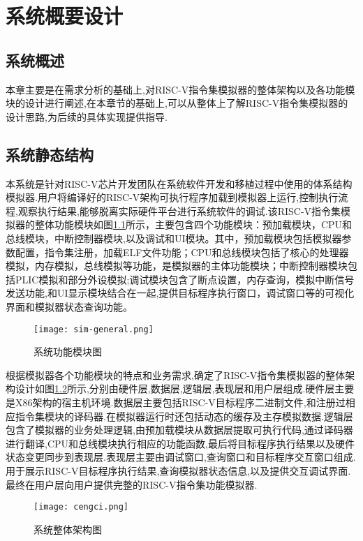 
\chapter{系统概要设计}

\section{系统概述}
本章主要是在需求分析的基础上,对RISC-V指令集模拟器的整体架构以及各功能模块的设计进行阐述,在本章节的基础上,可以从整体上了解RISC-V指令集模拟器的设计思路,为后续的具体实现提供指导.


\section{系统静态结构}
本系统是针对RISC-V芯片开发团队在系统软件开发和移植过程中使用的体系结构模拟器.用户将编译好的RISC-V架构可执行程序加载到模拟器上运行,控制执行流程,观察执行结果,能够脱离实际硬件平台进行系统软件的调试.该RISC-V指令集模拟器的整体功能模块如图\ref{fig:sim_general}所示，主要包含四个功能模块：预加载模块，CPU和总线模块，中断控制器模块,以及调试和UI模块。其中，预加载模块包括模拟器参数配置，指令集注册，加载ELF文件功能；CPU和总线模块包括了核心的处理器模拟，内存模拟，总线模拟等功能，是模拟器的主体功能模块；中断控制器模块包括PLIC模拟和部分外设模拟;调试模块包含了断点设置，内存查询，模拟中断信号发送功能,和UI显示模块结合在一起,提供目标程序执行窗口，调试窗口等的可视化界面和模拟器状态查询功能。
\begin{figure}[H]
  \centering
  \texttt{[image: sim-general.png]}
  \caption{系统功能模块图}
  \label{fig:sim_general}
\end{figure}


根据模拟器各个功能模块的特点和业务需求,确定了RISC-V指令集模拟器的整体架构设计如图\ref{fig:structure}所示,分别由硬件层,数据层,逻辑层,表现层和用户层组成.硬件层主要是X86架构的宿主机环境.数据层主要包括RISC-V目标程序二进制文件,和注册过相应指令集模块的译码器.在模拟器运行时还包括动态的缓存及主存模拟数据.逻辑层包含了模拟器的业务处理逻辑,由预加载模块从数据层提取可执行代码,通过译码器进行翻译,CPU和总线模块执行相应的功能函数,最后将目标程序执行结果以及硬件状态变更同步到表现层.表现层主要由调试窗口,查询窗口和目标程序交互窗口组成.用于展示RISC-V目标程序执行结果,查询模拟器状态信息,以及提供交互调试界面.最终在用户层向用户提供完整的RISC-V指令集功能模拟器.


\begin{figure}[H]
  \centering
  \texttt{[image: cengci.png]}
  \caption{系统整体架构图}
  \label{fig:structure}
\end{figure}


